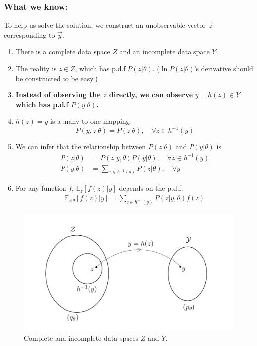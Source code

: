 \documentclass[11pt,a4paper]{article}
\begin{document}
\subsubsection*{What we know:}
To help us solve the solution, we construct an unobservable vector $\vec{z}$ corresponding to $\vec{y}$.
\begin{enumerate}
    \item There is a complete data space $Z$ and an incomplete data space $Y$.
    \item The reality is $z\in Z$, which has p.d.f $P(z|\theta)$. ($\ln P(z|\theta)$'s derivative should be constructed to be easy.)
    \item \textbf{Instead of observing the $z$ directly, we can observe $y=h(z)\in Y$ which has p.d.f $P(y|\theta)$.}
    \item $h(z)=y$ is a many-to-one mapping. $$P(y,z|\theta)=P(z|\theta),\quad \forall z\in h^{-1}(y)$$
    \item We can infer that the relationship between $P(z|\theta)$ and $P(y|\theta)$ is
    \begin{equation}
        \begin{aligned}
            P(z|\theta)&=P(z|y,\theta)P(y|\theta),\quad \forall z\in h^{-1}(y)\\
            P(y|\theta)&=\sum_{z\in h^{-1}(y)}P(z|\theta),\quad \forall y
        \end{aligned}
        \nonumber
    \end{equation}
    \item For any function $f$, $\mathbb{E}_z[f(z)|y]$ depends on the p.d.f.
    \begin{equation}
        \begin{aligned}
            \mathbb{E}_{z|\theta}[f(z)|y]=\sum_{z\in h^{-1}(y)}P(z|y,\theta)f(z)
        \end{aligned}
        \nonumber
    \end{equation}
\end{enumerate}
\begin{center}\begin{figure}[htbp]
    \centering
    \includegraphics[scale=0.2]{EM1.png}
    \caption{Complete and incomplete data spaces $Z$ and $Y$.}
    \label{}
\end{figure}\end{center}
\end{document}
